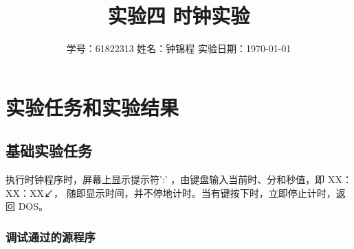 \documentclass[12pt, a4paper, oneside]{ctexart}
\title{实验四 \qquad  时钟实验}
\author{学号：61822313 \qquad 姓名：钟锦程 \qquad 实验日期：\today}
\date{}
\begin{document}
\maketitle
\section{实验任务和实验结果}
\subsection{基础实验任务}
执行时钟程序时，屏幕上显示提示符':' ，由键盘输入当前时、分和秒值，即 XX：XX：XX↙，
随即显示时间，并不停地计时。当有键按下时，立即停止计时，返回 DOS。
\subsubsection{调试通过的源程序}
\end{document}

